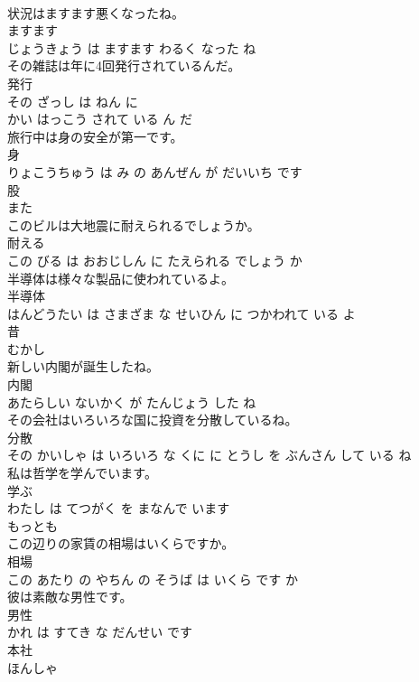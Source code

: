 \documentclass[8pt]{extreport}
\begin{document}
\begin{CJK}{UTF8}{min}
\\	状況はますます悪くなったね。	
\\	ますます 
\\	じょうきょう は ますます わるく なった ね			
\\	その雑誌は年に4回発行されているんだ。	
\\	発行 
\\	その ざっし は ねん に 
\\	かい はっこう されて いる ん だ			
\\	旅行中は身の安全が第一です。	
\\	身 
\\	りょこうちゅう は み の あんぜん が だいいち です			
\\	股	
\\	また			
\\	このビルは大地震に耐えられるでしょうか。	
\\	耐える 
\\	この びる は おおじしん に たえられる でしょう か			
\\	半導体は様々な製品に使われているよ。	
\\	半導体 
\\	はんどうたい は さまざま な せいひん に つかわれて いる よ			
\\	昔	
\\	むかし			
\\	新しい内閣が誕生したね。	
\\	内閣 
\\	あたらしい ないかく が たんじょう した ね			
\\	その会社はいろいろな国に投資を分散しているね。	
\\	分散 
\\	その かいしゃ は いろいろ な くに に とうし を ぶんさん して いる ね			
\\	私は哲学を学んでいます。	
\\	学ぶ 
\\	わたし は てつがく を まなんで います			
\\	もっとも	
\\	この辺りの家賃の相場はいくらですか。	
\\	相場 
\\	この あたり の やちん の そうば は いくら です か			
\\	彼は素敵な男性です。	
\\	男性 
\\	かれ は すてき な だんせい です			
\\	本社	
\\	ほんしゃ			

\end{CJK}
\end{document}
